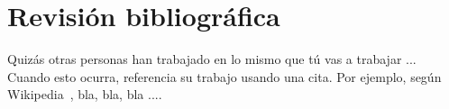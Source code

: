 \chapter{Revisión bibliográfica}
\label{sec:revision}

Quizás otras personas han trabajado en lo mismo que tú vas a trabajar
... Cuando esto ocurra, referencia su trabajo usando una cita. Por
ejemplo, según Wikipedia~\cite{Wikipedia}, bla, bla, bla ....

